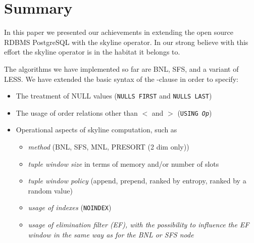%






\chapter{Summary}
\label{chap:summary}

In this paper we presented our achievements in extending the open source
RDBMS PostgreSQL with the skyline operator.  In our strong believe with
this effort the skyline operator is in the habitat it belongs to.

The algorithms we have implemented so far are BNL, SFS, and a variant
of LESS.  
We have extended the basic syntax of the -clause
\citep{Borzsonyi2001} in order to specify:

\begin{itemize}
\item The treatment of NULL values (\texttt{NULLS FIRST} and \texttt{NULLS LAST})
\item The usage of order relations other than $<$ and $>$ (\texttt{USING \emph{Op}})
\item Operational aspects of skyline computation, such as 
\begin{itemize}
\item \emph{method} (BNL, SFS, MNL, PRESORT (2 dim only))
\item \emph{tuple window size} in terms of memory and/or number of slots
\item \emph{tuple window policy} (append, prepend, ranked by entropy, ranked by a random value)
\item \emph{usage of indexes} (\texttt{NOINDEX})
\item \emph{usage of elimination filter (EF), 
  	with the possibility to influence the EF window in the same way
  	as for the BNL or SFS node}
\end{itemize}
\end{itemize}

